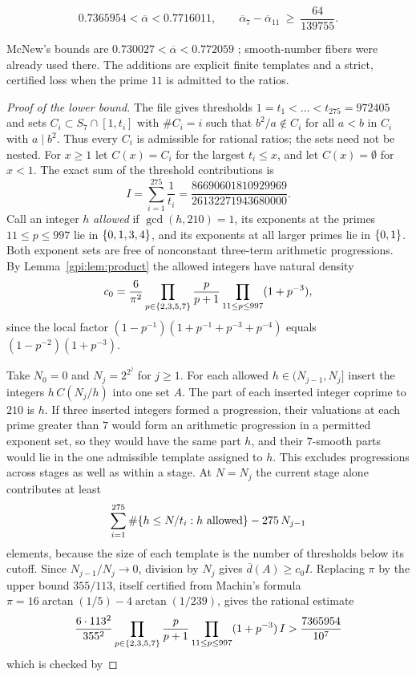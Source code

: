 \begin{theorem}\label{gpi:thm:upper-alpha}
\[
 0.7365954<\overline\alpha<0.7716011,\qquad
 \overline\alpha_7-\overline\alpha_{11}\ \ge\ \frac{64}{139755}.
\]
\end{theorem}

McNew's bounds are $0.730027<\overline\alpha<0.772059$ \cite[Theorems~4.3 and~4.5]{McNew2015Sets};
smooth-number fibers were already used there. The additions are explicit finite templates
and a strict, certified loss when the prime $11$ is admitted to the ratios.

\begin{proof}[Proof of the lower bound]
The file
gives
thresholds $1=t_1<\dots<t_{275}=972405$ and sets $C_i\subset S_7\cap[1,t_i]$ with $\#C_i=i$
such that $b^2/a\notin C_i$ for all $a<b$ in $C_i$ with $a\mid b^2$. Thus every $C_i$ is
admissible for rational ratios; the sets need not be nested. For $x\ge1$ let $C(x)=C_i$ for
the largest $t_i\le x$, and let $C(x)=\emptyset$ for $x<1$. The exact sum of the threshold
contributions is
\[
 I=\sum_{i=1}^{275}\frac1{t_i}=\frac{86690601810929969}{26132271943680000}.
\]
Call an integer $h$ \emph{allowed} if $\gcd(h,210)=1$, its exponents at the primes
$11\le p\le997$ lie in $\{0,1,3,4\}$, and its exponents at all larger primes lie in
$\{0,1\}$. Both exponent sets are free of nonconstant three-term arithmetic progressions.
By Lemma~\ref{gpi:lem:product} the allowed integers have natural density
\[
 c_0=\frac6{\pi^2}\prod_{p\in\{2,3,5,7\}}\frac p{p+1}\prod_{11\le p\le997}(1+p^{-3}),
\]
since the local factor $(1-p^{-1})(1+p^{-1}+p^{-3}+p^{-4})$ equals $(1-p^{-2})(1+p^{-3})$.

Take $N_0=0$ and $N_j=2^{2^j}$ for $j\ge1$. For each allowed $h\in(N_{j-1},N_j]$ insert the
integers $h\,C(N_j/h)$ into one set $A$. The part of each inserted integer coprime to $210$
is $h$. If three inserted integers formed a progression, their valuations at each prime
greater than $7$ would form an arithmetic progression in a permitted exponent set, so they
would have the same part $h$, and their $7$-smooth parts would lie in the one admissible
template assigned to $h$. This excludes progressions across stages as well as within a
stage. At $N=N_j$ the current stage alone contributes at least
\[
 \sum_{i=1}^{275}\#\{h\le N/t_i:h\text{ allowed}\}-275\,N_{j-1}
\]
elements, because the size of each template is the number of thresholds below its cutoff.
Since $N_{j-1}/N_j\to0$, division by $N_j$ gives $\overline d(A)\ge c_0I$. Replacing $\pi$ by
the upper bound $355/113$, itself certified from Machin's formula
$\pi=16\arctan(1/5)-4\arctan(1/239)$, gives the rational estimate
\[
 \frac{6\cdot113^2}{355^2}\prod_{p\in\{2,3,5,7\}}\frac p{p+1}
 \prod_{11\le p\le997}(1+p^{-3})\,I>\frac{7365954}{10^7}
\]
which is checked by
\end{proof}

